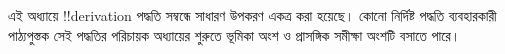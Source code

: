 \documentclass[../../../include/open-logic-chapter]{subfiles}
\begin{document}
      {}
      {}

\begin{editorial}
এই অধ্যায়ে !!{derivation} পদ্ধতি সম্বন্ধে সাধারণ উপকরণ একত্র করা হয়েছে।
কোনো নির্দিষ্ট পদ্ধতি ব্যবহারকারী পাঠ্যপুস্তক সেই পদ্ধতির পরিচায়ক অধ্যায়ের
শুরুতে ভূমিকা অংশ ও প্রাসঙ্গিক সমীক্ষা অংশটি বসাতে পারে।
\end{editorial}






\OLEndChapterHook
\end{document}
